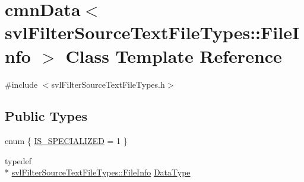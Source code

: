 \hypertarget{classcmn_data_3_01svl_filter_source_text_file_types_1_1_file_info_01_4}{\section{cmn\-Data$<$ svl\-Filter\-Source\-Text\-File\-Types\-:\-:File\-Info $>$ Class Template Reference}
\label{classcmn_data_3_01svl_filter_source_text_file_types_1_1_file_info_01_4}
}


{\ttfamily \#include $<$svl\-Filter\-Source\-Text\-File\-Types.\-h$>$}

\subsection*{Public Types}
\begin{DoxyCompactItemize}
\item 
enum \{ \hyperlink{classcmn_data_3_01svl_filter_source_text_file_types_1_1_file_info_01_4_a2e5d9a61fecf95c7680b60ddfcd7cf61aa76bfad2562771d868ca2393ab1d17af}{I\-S\-\_\-\-S\-P\-E\-C\-I\-A\-L\-I\-Z\-E\-D} = 1
 \}
\item 
typedef \\*
\hyperlink{classsvl_filter_source_text_file_types_1_1_file_info}{svl\-Filter\-Source\-Text\-File\-Types\-::\-File\-Info} \hyperlink{classcmn_data_3_01svl_filter_source_text_file_types_1_1_file_info_01_4_a80103f0f921c89187ac2cadd6fd22d7b}{Data\-Type}
\end{DoxyCompactItemize}
